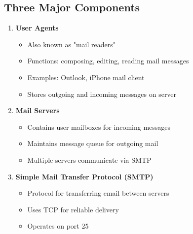 \documentclass[12pt]{article}
\begin{document}
\subsection{Three Major Components}
\begin{enumerate}
    \item \textbf{User Agents}
          \begin{itemize}
              \item Also known as "mail readers"
              \item Functions: composing, editing, reading mail messages
              \item Examples: Outlook, iPhone mail client
              \item Stores outgoing and incoming messages on server
          \end{itemize}

    \item \textbf{Mail Servers}
          \begin{itemize}
              \item Contains user mailboxes for incoming messages
              \item Maintains message queue for outgoing mail
              \item Multiple servers communicate via SMTP
          \end{itemize}

    \item \textbf{Simple Mail Transfer Protocol (SMTP)}
          \begin{itemize}
              \item Protocol for transferring email between servers
              \item Uses TCP for reliable delivery
              \item Operates on port 25
          \end{itemize}
\end{enumerate}
\end{document}
